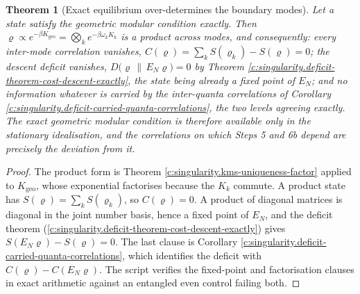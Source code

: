 \documentclass[11pt]{article}
\newtheorem{theorem}{Theorem}[section]
\theoremstyle{definition}
\theoremstyle{plain}
\providecommand{\EN}{}\renewcommand{\EN}{E_{N}}
\providecommand{\rel}{}\renewcommand{\rel}[2]{D\bigl(#1 \,\|\, #2\bigr)}
\begin{document}
\begin{theorem}[Exact equilibrium over-determines the boundary modes]\label{c:singularity.exact-equilibrium-over-determines-boundary-modes}
Let a state satisfy the geometric modular condition exactly. Then $\varrho \propto e^{-\beta K_{\mathrm{geo}}} = \bigotimes_k e^{-\beta\omega_k K_k}$ is a product across modes, and consequently: every inter-mode correlation vanishes, $C(\varrho) = \sum_k S(\varrho_k) - S(\varrho) = 0$; the descent deficit vanishes, $\rel{\varrho}{\EN\varrho} = 0$ by Theorem \ref{c:singularity.deficit-theorem-cost-descent-exactly}, the state being already a fixed point of $\EN$; and no information whatever is carried by the inter-quanta correlations of Corollary \ref{c:singularity.deficit-carried-quanta-correlations}, the two levels agreeing exactly. The exact geometric modular condition is therefore available only in the stationary idealisation, and the correlations on which Steps 5 and 6b depend are precisely the deviation from it.
\end{theorem}
\begin{proof}
The product form is Theorem \ref{c:singularity.kms-uniqueness-factor} applied to $K_{\mathrm{geo}}$, whose exponential factorises because the $K_k$ commute. A product state has $S(\varrho) = \sum_k S(\varrho_k)$, so $C(\varrho) = 0$. A product of diagonal matrices is diagonal in the joint number basis, hence a fixed point of $\EN$, and the deficit theorem (\ref{c:singularity.deficit-theorem-cost-descent-exactly}) gives $S(\EN\varrho) - S(\varrho) = 0$. The last clause is Corollary \ref{c:singularity.deficit-carried-quanta-correlations}, which identifies the deficit with $C(\varrho) - C(\EN\varrho)$. The script verifies the fixed-point and factorisation clauses in exact arithmetic against an entangled even control failing both.

\end{proof}
\end{document}
